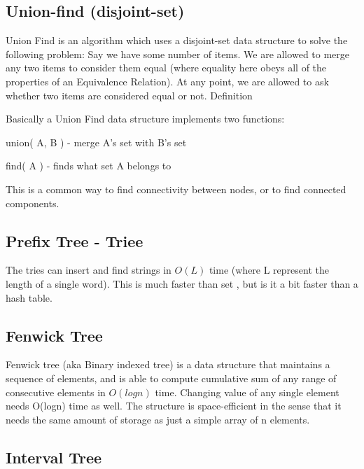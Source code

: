 \documentclass[10pt,letterpaper,twocolumn,twosided]{article}
\newcommand{\codigofuente}[1]{

\dotfill
}
\begin{document}
\codigofuente{src/structures/rmq.cpp}

\subsection{Union-find (disjoint-set)}

Union Find is an algorithm which uses a disjoint-set data structure to solve the following problem: Say we have some number of items. We are allowed to merge any two items to consider them equal (where equality here obeys all of the properties of an Equivalence Relation). At any point, we are allowed to ask whether two items are considered equal or not.
Definition

Basically a Union Find data structure implements two functions:

union( A, B ) - merge A's set with B's set

find( A ) - finds what set A belongs to

This is a common way to find connectivity between nodes, or to find connected components.

\codigofuente{src/structures/uf.cpp}


\subsection{Prefix Tree - Triee}

The tries can insert and find strings in $O(L)$ time (where L represent the length of a single word). This is much faster than set , but is it a bit faster than a hash table.


\codigofuente{src/structures/trie.cpp}


\subsection{Fenwick Tree}

Fenwick tree (aka Binary indexed tree) is a data structure that maintains a sequence of elements, and is able to compute cumulative sum of any range of consecutive elements in $O(logn)$ time. Changing value of any single element needs O(logn) time as well.
The structure is space-efficient in the sense that it needs the same amount of storage as just a simple array of n elements.

\codigofuente{src/structures/fenwick.cpp}

\subsection{Interval Tree}
\end{document}
